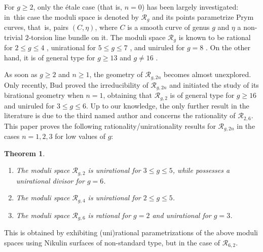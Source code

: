 \documentclass[11pt]{article}
\newcommand{\skpt}{\smallskip}
\newenvironment{enumeratea}
{\bgroup\def\theenumi{\alph{enumi}}\begin{enumerate}}
{\end{enumerate}\egroup}
\renewcommand{\theenumi}{\roman{enumi}}
\theoremstyle{plain}
\newtheorem{thm}{Theorem}[section]
\theoremstyle{definition}
\newcommand\R{{\mathcal R}}
\begin{document}
For $g\geq 2$, only the étale case (that is, $n=0$) has been largely investigated: in~this case the moduli space is denoted by $\R_g$ and its points parametrize Prym curves, that~is, pairs $(C,\eta)$, where $C$ is a smooth curve of genus $g$ and $\eta$ a non-trivial $2$\nobreakdash-torsion line bundle on it. The moduli space $\R_g$ is known to be rational for $2\leq g\leq 4$ \cite{Do2,Ca}, unirational for $5\leq g\leq 7$ \cite{Don,ILS,V1,V2,FV1,FV2}, and uniruled for $g=8$ \cite{FV2}. On the other hand, it is of general type for $g\geq 13$ and $g\neq 16$ \cite{FL,Br}.

As soon as $g\geq 2$ and $n\geq 1$, the geometry of $\mathcal R_{g,2n}$ becomes almost unexplored. Only recently, Bud \cite{Bu} proved the irreducibility of $\mathcal R_{g,2n}$ and initiated the study of its birational geometry when $n=1$, obtaining that $\mathcal R_{g,2}$ is of general type for $g\geq 16$ and uniruled for $3\leq g\leq 6$. Up to our knowledge, the only further result in the literature is due to the third named author \cite{NOV} and concerns the rationality of $\R_{2,6}$. This paper proves the following rationality/unirationality results for $\mathcal R_{g,2n}$ in the cases $n=1,2,3$ for low values of $g$:

\skpt
\begin{thm}\label{pescara}
\begin{enumeratea}
\item
The moduli space $\R_{g,2}$ is unirational for $3\leq g\leq 5$, while possesses a unirational divisor for $g=6$. 
\item
The moduli space $\R_{g,4}$ is unirational for $2\leq g\leq 5$.
\item
The moduli space $\R_{g,6}$ is rational for $g=2$ and unirational for $g=3$. 
\end{enumeratea}
\end{thm}

This is obtained by exhibiting (uni)rational parametrizations of the above moduli spaces using Nikulin surfaces of non-standard type, but in the case of $\mathcal R_{6,2}$.
\end{document}
